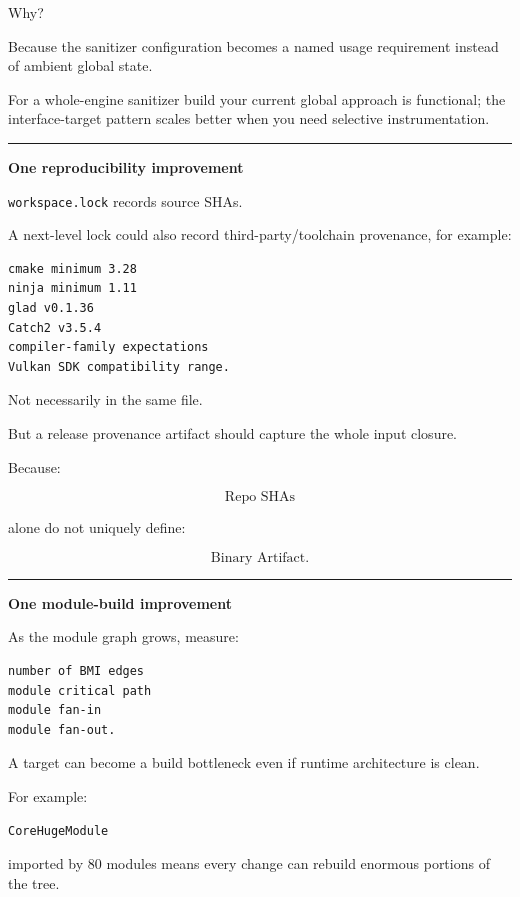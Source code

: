 Why?

Because the sanitizer configuration becomes a named usage requirement instead of ambient global state.

For a whole-engine sanitizer build your current global approach is functional; the interface-target pattern scales better when you need selective instrumentation.

\begin{center}\rule{0.5\linewidth}{0.5pt}\end{center}

\textbf{One reproducibility improvement}

\texttt{workspace.lock} records source SHAs.

A next-level lock could also record third-party/toolchain provenance, for example:

\begin{verbatim}
cmake minimum 3.28
ninja minimum 1.11
glad v0.1.36
Catch2 v3.5.4
compiler-family expectations
Vulkan SDK compatibility range.
\end{verbatim}

Not necessarily in the same file.

But a release provenance artifact should capture the whole input closure.

Because:

\[
\text{Repo SHAs}
\]

alone do not uniquely define:

\[
\text{Binary Artifact}.
\]

\begin{center}\rule{0.5\linewidth}{0.5pt}\end{center}

\textbf{One module-build improvement}

As the module graph grows, measure:

\begin{verbatim}
number of BMI edges
module critical path
module fan-in
module fan-out.
\end{verbatim}

A target can become a build bottleneck even if runtime architecture is clean.

For example:

\begin{verbatim}
CoreHugeModule
\end{verbatim}

imported by 80 modules means every change can rebuild enormous portions of the tree.


